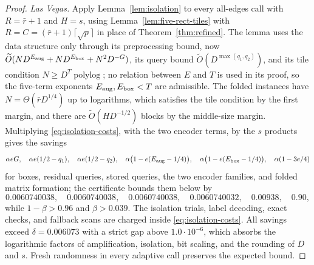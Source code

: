 \documentclass[11pt]{article}
\newcommand{\softO}{\widetilde O}
\begin{document}
\begin{proof}
\emph{Las Vegas.} Apply Lemma~\ref{lem:isolation} to every all-edges call
with $R=\bar r+1$ and $H=s$, using Lemma~\ref{lem:five-rect-tiles} with
$R=C=(\bar r+1)\lceil\sqrt p\rceil$ in place of Theorem~\ref{thm:refined}.
The lemma uses the data structure only through its preprocessing bound, now
$\softO(ND^{E_{\rm aug}}+ND^{E_{\rm box}}+N^2D^{-G})$, its query bound
$\softO(D^{\max(q_1,q_2)})$, and its tile condition
$N\ge D^T\operatorname{polylog}$; no relation between $E$ and $T$ is used in
its proof, so the five-term exponents $E_{\rm aug},E_{\rm box}<T$ are
admissible. The folded instances have $N=\Theta(\bar rD^{1/4})$ up to logarithms,
which satisfies the tile condition by the first margin, and there are
$\softO(HD^{-1/2})$ blocks by the middle-size margin. Multiplying
\eqref{eq:isolation-costs}, with the two encoder terms, by the $s$ products
gives the savings
\[
\alpha eG,\quad\alpha e(1/2-q_1),\quad\alpha e(1/2-q_2),\quad
\alpha\bigl(1-e(E_{\rm aug}-1/4)\bigr),\quad
\alpha\bigl(1-e(E_{\rm box}-1/4)\bigr),\quad\alpha(1-3e/4)
\]
for boxes, residual queries, stored queries, the two encoder families, and
folded matrix formation; the certificate bounds them below by
\[
0.0060740038,\quad0.0060740038,\quad0.0060740038,\quad0.0060740032,\quad
0.00938,\quad0.90,
\]
while $1-\beta>0.96$ and $\beta>0.039$. The isolation trials, label
decoding, exact checks, and fallback scans are charged inside
\eqref{eq:isolation-costs}. All savings exceed $\delta=0.006073$ with a
strict gap above $1.0\cdot10^{-6}$, which absorbs the logarithmic factors of
amplification, isolation, bit scaling, and the rounding of $D$ and $s$.
Fresh randomness in every adaptive call preserves the expected bound.


\end{proof}
\end{document}
